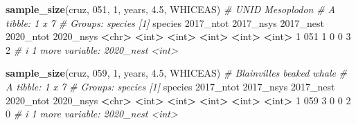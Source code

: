 \documentclass[
]{book}
\newenvironment{Shaded}{\begin{snugshade}}{\end{snugshade}}
\newcommand{\AttributeTok}[1]{\textcolor[rgb]{0.13,0.29,0.53}{#1}}
\newcommand{\CommentTok}[1]{\textcolor[rgb]{0.56,0.35,0.01}{\textit{#1}}}
\newcommand{\DecValTok}[1]{\textcolor[rgb]{0.00,0.00,0.81}{#1}}
\newcommand{\ErrorTok}[1]{\textcolor[rgb]{0.64,0.00,0.00}{\textbf{#1}}}
\newcommand{\FloatTok}[1]{\textcolor[rgb]{0.00,0.00,0.81}{#1}}
\newcommand{\FunctionTok}[1]{\textcolor[rgb]{0.13,0.29,0.53}{\textbf{#1}}}
\newcommand{\NormalTok}[1]{#1}
\newcommand{\SpecialCharTok}[1]{\textcolor[rgb]{0.81,0.36,0.00}{\textbf{#1}}}
\newcommand{\StringTok}[1]{\textcolor[rgb]{0.31,0.60,0.02}{#1}}
\begin{document}
\begin{Shaded}
\begin{Highlighting}[]
\FunctionTok{sample\_size}\NormalTok{(cruz, }\StringTok{\textquotesingle{}051\textquotesingle{}}\NormalTok{, }\DecValTok{1}\NormalTok{, years, }\FloatTok{4.5}\NormalTok{, }\StringTok{\textquotesingle{}WHICEAS\textquotesingle{}}\NormalTok{) }\CommentTok{\# UNID Mesoplodon}
\CommentTok{\# A tibble: 1 x 7}
\CommentTok{\# Groups:   species [1]}
\NormalTok{  species }\StringTok{\textasciigrave{}}\AttributeTok{2017\_ntot}\StringTok{\textasciigrave{}} \StringTok{\textasciigrave{}}\AttributeTok{2017\_nsys}\StringTok{\textasciigrave{}} \StringTok{\textasciigrave{}}\AttributeTok{2017\_nest}\StringTok{\textasciigrave{}} \StringTok{\textasciigrave{}}\AttributeTok{2020\_ntot}\StringTok{\textasciigrave{}} \StringTok{\textasciigrave{}}\AttributeTok{2020\_nsys}\StringTok{\textasciigrave{}}
  \SpecialCharTok{\textless{}}\NormalTok{chr}\SpecialCharTok{\textgreater{}}         \ErrorTok{\textless{}}\NormalTok{int}\SpecialCharTok{\textgreater{}}       \ErrorTok{\textless{}}\NormalTok{int}\SpecialCharTok{\textgreater{}}       \ErrorTok{\textless{}}\NormalTok{int}\SpecialCharTok{\textgreater{}}       \ErrorTok{\textless{}}\NormalTok{int}\SpecialCharTok{\textgreater{}}       \ErrorTok{\textless{}}\NormalTok{int}\SpecialCharTok{\textgreater{}}
\DecValTok{1} \DecValTok{051}               \DecValTok{1}           \DecValTok{0}           \DecValTok{0}           \DecValTok{3}           \DecValTok{2}
\CommentTok{\# i 1 more variable: \textasciigrave{}2020\_nest\textasciigrave{} \textless{}int\textgreater{}}

\FunctionTok{sample\_size}\NormalTok{(cruz, }\StringTok{\textquotesingle{}059\textquotesingle{}}\NormalTok{, }\DecValTok{1}\NormalTok{, years, }\FloatTok{4.5}\NormalTok{, }\StringTok{\textquotesingle{}WHICEAS\textquotesingle{}}\NormalTok{) }\CommentTok{\# Blainville\textquotesingle{}s beaked whale}
\CommentTok{\# A tibble: 1 x 7}
\CommentTok{\# Groups:   species [1]}
\NormalTok{  species }\StringTok{\textasciigrave{}}\AttributeTok{2017\_ntot}\StringTok{\textasciigrave{}} \StringTok{\textasciigrave{}}\AttributeTok{2017\_nsys}\StringTok{\textasciigrave{}} \StringTok{\textasciigrave{}}\AttributeTok{2017\_nest}\StringTok{\textasciigrave{}} \StringTok{\textasciigrave{}}\AttributeTok{2020\_ntot}\StringTok{\textasciigrave{}} \StringTok{\textasciigrave{}}\AttributeTok{2020\_nsys}\StringTok{\textasciigrave{}}
  \SpecialCharTok{\textless{}}\NormalTok{chr}\SpecialCharTok{\textgreater{}}         \ErrorTok{\textless{}}\NormalTok{int}\SpecialCharTok{\textgreater{}}       \ErrorTok{\textless{}}\NormalTok{int}\SpecialCharTok{\textgreater{}}       \ErrorTok{\textless{}}\NormalTok{int}\SpecialCharTok{\textgreater{}}       \ErrorTok{\textless{}}\NormalTok{int}\SpecialCharTok{\textgreater{}}       \ErrorTok{\textless{}}\NormalTok{int}\SpecialCharTok{\textgreater{}}
\DecValTok{1} \DecValTok{059}               \DecValTok{3}           \DecValTok{0}           \DecValTok{0}           \DecValTok{2}           \DecValTok{0}
\CommentTok{\# i 1 more variable: \textasciigrave{}2020\_nest\textasciigrave{} \textless{}int\textgreater{}}


\end{Highlighting}
\end{Shaded}
\end{document}
